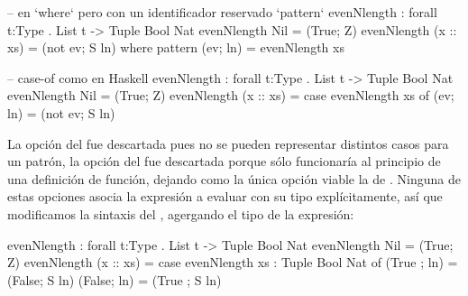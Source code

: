 {\begin{designfr}
\begin{anglercode}[morekeywords={pattern}]
-- en `where` pero con un identificador reservado `pattern`
evenNlength : forall t:Type . List t -> Tuple Bool Nat
evenNlength Nil = (True; Z)
evenNlength (x :: xs) = (not ev; S ln)
    where
        pattern (ev; ln) = evenNlength xs

-- case-of como en Haskell
evenNlength : forall t:Type . List t -> Tuple Bool Nat
evenNlength Nil = (True; Z)
evenNlength (x :: xs) =
    case evenNlength xs of
        (ev; ln) = (not ev; S ln)
\end{anglercode}

La opción del  fue descartada pues no se pueden representar distintos casos para un patrón, la opción del  fue descartada porque sólo funcionaría al principio de una definición de función, dejando como la única opción viable la de . Ninguna de estas opciones asocia la expresión a evaluar con su tipo explícitamente, así que modificamos la sintaxis del , agergando el tipo de la expresión:

\begin{anglercode}
evenNlength : forall t:Type . List t -> Tuple Bool Nat
evenNlength Nil = (True; Z)
evenNlength (x :: xs) =
    case evenNlength xs : Tuple Bool Nat of
        (True ; ln) = (False; S ln)
        (False; ln) = (True ; S ln)
\end{anglercode}
\end{designfr}

}
